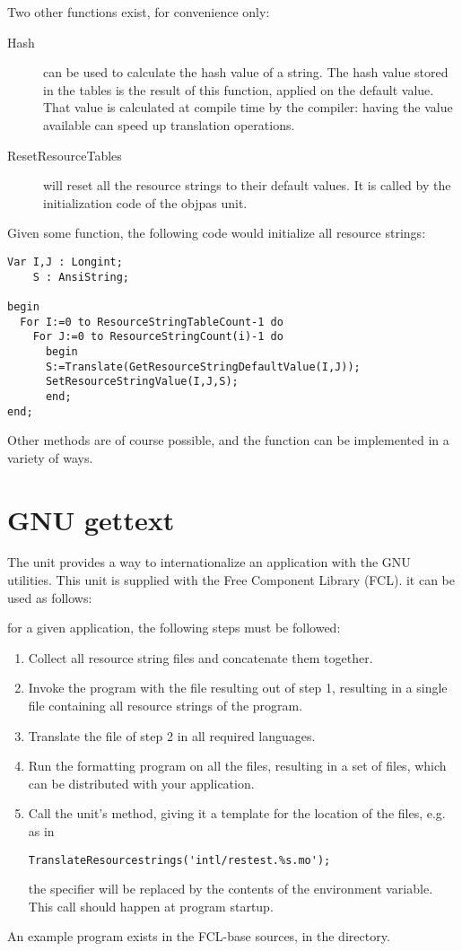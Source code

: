 Two other functions exist, for convenience only:
\begin{description}
\item [Hash] can be used to calculate the hash value of a string. The hash
value stored in the tables is the result of this function, applied on the
default value. That value is calculated at compile time by the compiler:
having the value available can speed up translation operations. 
\item[ResetResourceTables] will reset all the resource strings to their
default values. It is called by the initialization code of the objpas unit.
\end{description}

Given some  function, the following code would initialize
all resource strings:
\begin{verbatim}
Var I,J : Longint;
    S : AnsiString;

begin
  For I:=0 to ResourceStringTableCount-1 do
    For J:=0 to ResourceStringCount(i)-1 do
      begin
      S:=Translate(GetResourceStringDefaultValue(I,J));
      SetResourceStringValue(I,J,S);
      end;
end;
\end{verbatim}
Other methods are of course possible, and the  function
can be implemented in a variety of ways.
\section{GNU gettext}
The unit  provides a way to internationalize an application
with the GNU  utilities. This unit is supplied with  the
Free Component Library (FCL). it can be used as follows:

for a given application, the following steps must be followed:
\begin{enumerate}
\item Collect all resource string files and concatenate them together.
\item Invoke the  program with the file resulting out of step
1, resulting in a single  file containing all resource strings of
the program.
\item Translate the  file of step 2 in all required languages.
\item Run the  formatting program on all the  files,
resulting in a set of  files, which can be distributed with your
application.
\item Call the  unit's  method,
giving it a template for the location of the  files, e.g. as in
\begin{verbatim}
TranslateResourcestrings('intl/restest.%s.mo');
\end{verbatim}
the  specifier will be replaced by the contents of the 
environment variable. This call should happen at program startup.
\end{enumerate}
An example program exists in the FCL-base sources, in the 
directory.
